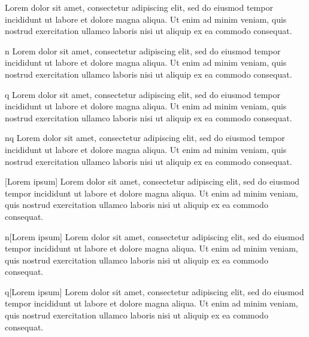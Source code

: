 \begin{proposition}{}
	Lorem dolor sit amet, consectetur adipiscing elit, sed do eiusmod tempor incididunt ut labore et dolore magna aliqua. Ut enim ad minim veniam, quis nostrud exercitation ullamco laboris nisi ut aliquip ex ea commodo consequat.
\end{proposition}

\begin{proposition}{n}
	Lorem dolor sit amet, consectetur adipiscing elit, sed do eiusmod tempor incididunt ut labore et dolore magna aliqua. Ut enim ad minim veniam, quis nostrud exercitation ullamco laboris nisi ut aliquip ex ea commodo consequat.
\end{proposition}

\begin{proposition}{q}
	Lorem dolor sit amet, consectetur adipiscing elit, sed do eiusmod tempor incididunt ut labore et dolore magna aliqua. Ut enim ad minim veniam, quis nostrud exercitation ullamco laboris nisi ut aliquip ex ea commodo consequat.
\end{proposition}

\begin{proposition}{nq}
	Lorem dolor sit amet, consectetur adipiscing elit, sed do eiusmod tempor incididunt ut labore et dolore magna aliqua. Ut enim ad minim veniam, quis nostrud exercitation ullamco laboris nisi ut aliquip ex ea commodo consequat.
\end{proposition}

\begin{proposition}{}[Lorem ipsum]
	Lorem dolor sit amet, consectetur adipiscing elit, sed do eiusmod tempor incididunt ut labore et dolore magna aliqua. Ut enim ad minim veniam, quis nostrud exercitation ullamco laboris nisi ut aliquip ex ea commodo consequat.
\end{proposition}

\begin{proposition}{n}[Lorem ipsum]
	Lorem dolor sit amet, consectetur adipiscing elit, sed do eiusmod tempor incididunt ut labore et dolore magna aliqua. Ut enim ad minim veniam, quis nostrud exercitation ullamco laboris nisi ut aliquip ex ea commodo consequat.
\end{proposition}

\begin{proposition}{q}[Lorem ipsum]
	Lorem dolor sit amet, consectetur adipiscing elit, sed do eiusmod tempor incididunt ut labore et dolore magna aliqua. Ut enim ad minim veniam, quis nostrud exercitation ullamco laboris nisi ut aliquip ex ea commodo consequat.
\end{proposition}

